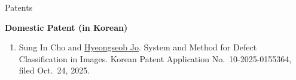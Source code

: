 \begin{rSection}{Patents}
  \begin{samepage}
    \textbf{Domestic Patent (in Korean)}
    \nopagebreak[4]
    \begin{enumerate}
      \item Sung In Cho and \uline{Hyeongseob Jo}. System and Method for Defect Classification in Images. Korean Patent Application No.~10-2025-0155364, filed Oct.~24, 2025.
    \end{enumerate}
  \end{samepage}
\end{rSection}
